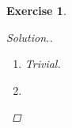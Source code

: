 \documentclass{article}
\theoremstyle{breakstyle}
\newtheorem{exercise}{Exercise}
\newenvironment{solution}
  {\begin{proof}[Solution.]\renewcommand{\qedsymbol}{}}
  {\end{proof}}
\let\ker\relax
\DeclareMathOperator{\ker}{Ker}
\DeclareMathOperator{\rad}{Rad}
\DeclareMathOperator{\nil}{Nil}
\begin{document}
\begin{exercise}
\begin{solution}
\begin{enumerate}[label=({\roman*})]
                $$
                V(\phi^{-1}(\nil(B)))=V(\nil(A))
                $$
                $\Leftrightarrow$ 
                $$
                \rad(\phi^{-1}(\nil(B)))=\nil(A)
                \eqno{(2)}
                $$
                To prove $((1)\Leftrightarrow(2))$, we only need
                $$
                \ker(\phi)\subseteq \rad(\phi^{-1}(\nil(B)))
                $$
                $\Leftarrow$ 
                $$
                \ker(\phi)\subseteq \phi^{-1}(\nil(B))
                $$
                $\Leftrightarrow$ 
                $$
                0_{B}\subseteq \nil(B)
                $$
                Which is trivial.
            \item Trivial.
            \item 
        \end{enumerate}
\end{solution}
\end{exercise}
\end{document}
